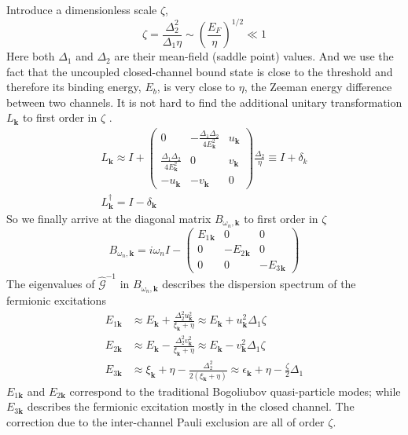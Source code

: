 \documentclass[reprint,pra]{revtex4-1}
\newcommand{\vk}{\ensuremath{\mathbf{k}}}
\newcommand{\br}[1]{\ensuremath{\left(#1\right)}}
\newcommand{\mtrx}[1]{\ensuremath{\begin{pmatrix}#1\end{pmatrix}}}
\newcommand{\dg}{\ensuremath{\dagger}}
\newcommand{\nG}{\ensuremath{\hat{\mathcal{G}}^{-1}}}
\begin{document}
Introduce a dimensionless scale $\zeta$,
\begin{equation}\label{eq:pathInt2:zetaDef}
\boxed{\zeta=\frac{\Delta_{2}^{2}}{\Delta_{1}\eta}\sim\br{\frac{E_{F}}{\eta}}^{1/2}\ll1}
\end{equation}
Here both $\Delta_{1}$ and $\Delta_{2}$ are their mean-field (saddle point) values.  And  we use the fact that the uncoupled closed-channel bound state is close to the threshold and therefore its binding energy, $E_b$, is very close to $\eta$,  the Zeeman energy difference between two channels.
It is not hard to find  the additional unitary transformation $L_{\vk}$ to   first order in $\zeta$ .
\begin{gather}\label{eq:pathInt2:L1}
L_{\vk}\approx{}I+
\mtrx{0&-\frac{\Delta_{1}{}\Delta_{2}{}}{4E^{2}_{\vk}}&u_{\vk}\\
\frac{\Delta_{1}{}\Delta_{2}{}}{4E^{2}_{\vk}}&0&v_{\vk}\\
-u_{\vk}&-v_{\vk}&0
}\frac{\Delta_{2}{}}{\eta}
\equiv{}I+\delta_{k}\\
L^{\dg}_{\vk}=I-\delta_{\vk}\nonumber
\end{gather}
So we finally arrive at the diagonal matrix $B_{\omega_{n},\vk}$ to first order in $\zeta$
\begin{equation}\label{eq:pathInt2:Bapprox}
B_{\omega_{n},\vk}=i\omega_{n}I-
	\begin{pmatrix}E_{1}{}_{\vk}&0&0\\0&-E_{2}{}_{\vk}&0\\0&0&-E_{3}{}_{\vk}\end{pmatrix}
\end{equation}
The eigenvalues of $\nG$  in $B_{\omega_{n},\vk}$ describes the dispersion spectrum of the  fermionic excitations
\begin{align}\label{eq:pathInt2:xiExpand}
E_{1\vk}&\approx{}E_{\vk}+\frac{\Delta_{2}^{2}u_{\vk}^{2}}{\xi_{\vk}+\eta}
\approx{}E_{\vk}+u_{\vk}^{2}\Delta_{1}\zeta\\
E_{2\vk}&\approx{}E_{\vk}-\frac{\Delta_{2}^{2}v_{\vk}^{2}}{\xi_{\vk}+\eta}
\approx{}E_{\vk}-v_{\vk}^{2}\Delta_{1}\zeta\label{eq:pathInt2:xiExpand2}\\
E_{3\vk}&\approx{}\xi_{\vk}+\eta-\frac{\Delta_{2}^{2}}{2(\xi_{\vk}+\eta)}
\approx{}\epsilon_{\vk}+\eta-\frac{\zeta}{2}\Delta_{1}
\label{eq:pathInt2:xiExpand3}
\end{align}
    $E_{1\vk}$ and $E_{2\vk}$ correspond to the traditional Bogoliubov quasi-particle modes; while $E_{3\vk}$ describes the fermionic excitation mostly in the closed channel.  The correction due to the inter-channel Pauli exclusion are all of order $\zeta$.
\end{document}
